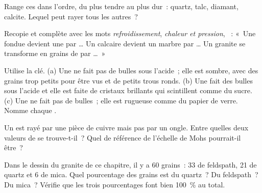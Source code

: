 \begin{exercise}[$\star$]\label{exo:g6:rocks-and-minerals:3}
Range ces  dans l'ordre, du plus tendre au plus dur~: quartz,
talc, diamant, calcite. Lequel peut rayer tous les autres~?
\end{exercise}

\begin{exercise}[$\star$]\label{exo:g6:rocks-and-minerals:4}
Recopie et complète avec les mots \emph{refroidissement},
\emph{chaleur et pression}, \emph{}~: «~Une  fondue devient
une  par \ldots{} Un calcaire devient un marbre par \ldots{} Un
granite se transforme en grains de  par \ldots~»
\end{exercise}

\begin{exercise}[$\star\star$]\label{exo:g6:rocks-and-minerals:5}
Utilise la clé. (a) Une  ne fait pas de bulles sous l'acide~; elle est
sombre, avec des grains trop petits pour être vus et de petits trous ronds.
(b) Une  fait des bulles sous l'acide et elle est faite de cristaux
brillants qui scintillent comme du sucre. (c) Une  ne fait pas de
bulles~; elle est rugueuse comme du papier de verre. Nomme chaque .
\end{exercise}

\begin{exercise}[$\star\star$]\label{exo:g6:rocks-and-minerals:6}
Un  est rayé par une pièce de cuivre mais pas par un ongle. Entre
quelles deux valeurs de  se trouve-t-il~? Quel  de référence
de l'échelle de Mohs pourrait-il être~?
\end{exercise}

\begin{exercise}[$\star\star$]\label{exo:g6:rocks-and-minerals:7}
Dans le dessin du granite de ce chapitre, il y a 60 grains~: 33 de
feldspath, 21 de quartz et 6 de mica. Quel pourcentage des grains est du
quartz~? Du feldspath~? Du mica~? Vérifie que les trois pourcentages font
bien 100~\% au total.
\end{exercise}

